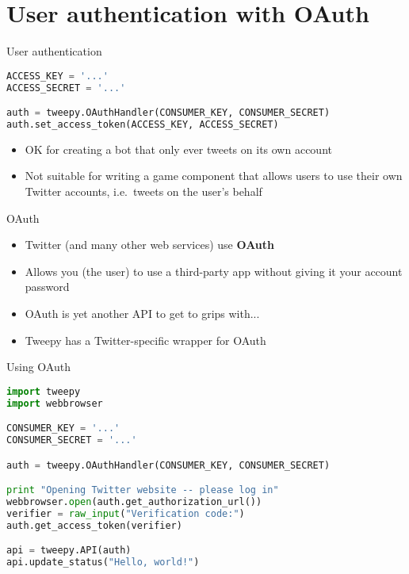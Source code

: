 \part{User authentication with OAuth}
\frame{\partpage}

\begin{frame}[fragile]{User authentication}
    \begin{lstlisting}[language=Python]
ACCESS_KEY = '...'
ACCESS_SECRET = '...'

auth = tweepy.OAuthHandler(CONSUMER_KEY, CONSUMER_SECRET)
auth.set_access_token(ACCESS_KEY, ACCESS_SECRET)
    \end{lstlisting}\pause
    \begin{itemize}
        \item OK for creating a bot that only ever tweets on its own account \pause
        \item Not suitable for writing a game component that allows users to use
            their own Twitter accounts, i.e.\ tweets on the user's behalf
    \end{itemize}
\end{frame}

\begin{frame}{OAuth}
    \begin{itemize}
        \item Twitter (and many other web services) use \textbf{OAuth} \pause
        \item Allows you (the user) to use a third-party app without giving it your account password \pause
        \item OAuth is yet another API to get to grips with... \pause
        \item Tweepy has a Twitter-specific wrapper for OAuth
    \end{itemize}
\end{frame}

\begin{frame}[fragile]{Using OAuth}
    \begin{lstlisting}[language=Python]
import tweepy
import webbrowser

CONSUMER_KEY = '...'
CONSUMER_SECRET = '...'

auth = tweepy.OAuthHandler(CONSUMER_KEY, CONSUMER_SECRET)

print "Opening Twitter website -- please log in"
webbrowser.open(auth.get_authorization_url())
verifier = raw_input("Verification code:")
auth.get_access_token(verifier)

api = tweepy.API(auth)
api.update_status("Hello, world!")
    \end{lstlisting}
\end{frame}

